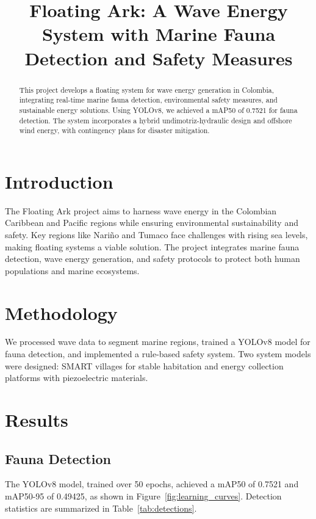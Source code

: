 \documentclass[conference]{IEEEtran}
\title{Floating Ark: A Wave Energy System with Marine Fauna Detection and Safety Measures}
\author{\IEEEauthorblockN{Anonymous Author}\IEEEauthorblockA{Anonymous Institution}}
\begin{document}
\maketitle

\begin{abstract}
This project develops a floating system for wave energy generation in Colombia, integrating real-time marine fauna detection, environmental safety measures, and sustainable energy solutions. Using YOLOv8, we achieved a mAP50 of 0.7521 for fauna detection. The system incorporates a hybrid undimotriz-hydraulic design and offshore wind energy, with contingency plans for disaster mitigation.
\end{abstract}

\section{Introduction}
The Floating Ark project aims to harness wave energy in the Colombian Caribbean and Pacific regions while ensuring environmental sustainability and safety. Key regions like Nariño and Tumaco face challenges with rising sea levels, making floating systems a viable solution. The project integrates marine fauna detection, wave energy generation, and safety protocols to protect both human populations and marine ecosystems.

\section{Methodology}
We processed wave data to segment marine regions, trained a YOLOv8 model for fauna detection, and implemented a rule-based safety system. Two system models were designed: SMART villages for stable habitation and energy collection platforms with piezoelectric materials.

\section{Results}
\subsection{Fauna Detection}
The YOLOv8 model, trained over 50 epochs, achieved a mAP50 of 0.7521 and mAP50-95 of 0.49425, as shown in Figure~\ref{fig:learning_curves}. Detection statistics are summarized in Table~\ref{tab:detections}.
\end{document}
